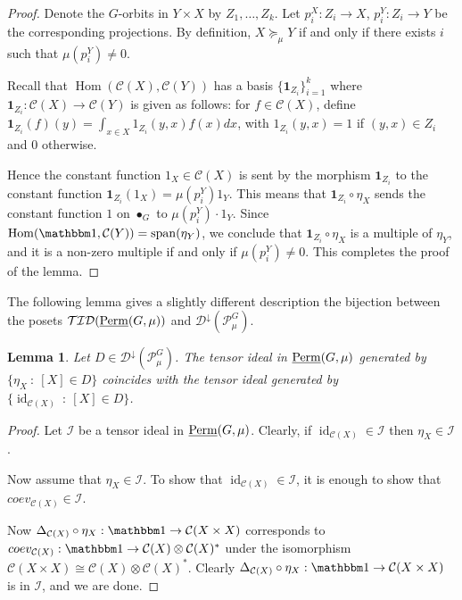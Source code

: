 \documentclass[11pt,a4paper]{amsart}
\theoremstyle{plain}%
\newtheorem{lemma}{Lemma}[subsection]
\theoremstyle{definition}
\theoremstyle{remark}
\newcommand{\Hom}{\operatorname{Hom}}
\newcommand{\triv}{{\mathbbm 1}}
\newcommand{\id}{\operatorname{id}}
\newcommand{\Span}{\mathrm{span}}
\newcommand{\Perm}{\underline{{\rm Perm}}}
\newcommand{\one}{{\mathbf{1}}}
\newcommand{\Down}{\mathcal{D}^{\downarrow}}
\newcommand{\cC}{\mathcal{C}}
\begin{document}
\begin{proof}
Denote the $G$-orbits in $Y\times X$ by $Z_1, \ldots, Z_k$. Let $p_i^X:Z_i\to X$, $p_i^Y:Z_i\to Y$ be the corresponding projections. By definition, $X\succeq_\mu Y$ if and only if there exists $i$ such that $\mu(p_i^Y)\neq 0$.

Recall that $\Hom(\mathcal{C}(X), \mathcal{C}(Y))$ has a basis $\{\one_{Z_i}\}_{i=1}^k$ where $\one_{Z_i}:\mathcal{C}(X)\to \mathcal{C}(Y)$ is given as follows: for $f\in \mathcal{C}(X)$, define $ \one_{Z_i}(f)(y)=\int_{x\in X}1_{Z_i}(y,x)f(x)dx$, with $1_{Z_i}(y,x)=1$ if $(y,x)\in Z_i$ and $0$ otherwise. 

Hence the constant function $1_X\in \cC(X)$ is sent by the morphism $\one_{Z_i}$ to the constant function $\one_{Z_i}(1_X)= \mu(p_i^Y)1_Y$. This means that $\one_{Z_i}\circ \eta_X$ sends the constant function $1$ on $\bullet_G$ to $\mu(p_i^Y)\cdot1_Y$. Since $\Hom(\triv, \mathcal{C}(Y))=\Span(\eta_Y)$, we conclude that $\one_{Z_i}\circ \eta_X$ is a multiple of $\eta_Y$, and it is a non-zero multiple if and only if $\mu(p_i^Y)\neq 0$.
This completes the proof of the lemma.

\end{proof}
The following lemma gives a slightly different description the bijection between the posets $\mathcal{TID}(\Perm(G, \mu))$ and $\Down(\mathcal{P}^G_\mu)$.
\begin{lemma}\label{cor:identities_gen_tens_ideal}
    Let $D\in  \Down(\mathcal{P}^G_\mu)$. The tensor ideal in $\Perm(G, \mu)$ generated by $\{\eta_X ~:~{[X]}\in D\}$ coincides with the tensor ideal generated by $\{\id_{\mathcal{C}(X)} ~:~{[X]}\in D\}$. 
\end{lemma}
\begin{proof}
    Let $\mathcal{I}$ be a tensor ideal in $\Perm(G, \mu)$. Clearly, if $\id_{\mathcal{C}(X)}\in \mathcal{I}$ then $\eta_X\in \mathcal{I}$. 

    Now assume that $\eta_X\in \mathcal{I}$. To show that $\id_{\mathcal{C}(X)}\in \mathcal{I}$, it is enough to show that $coev_{\mathcal{C}(X)}\in {\mathcal{I}}$.

    Now $\Delta_{\mathcal{C}(X)}\circ \eta_{X}:\triv \to \mathcal{C}(X\times X)$ corresponds to $coev_{\mathcal{C}(X)}: \triv \to \mathcal{C}(X)\otimes \mathcal{C}(X)^*$ under the isomorphism $\mathcal{C}(X\times X) \cong \mathcal{C}(X)\otimes \mathcal{C}(X)^*$. 
    Clearly $\Delta_{\mathcal{C}(X)}\circ \eta_{X}:\triv \to \mathcal{C}(X\times X)$ is in $\mathcal{I}$, and we are done.

    
\end{proof}
\end{document}
